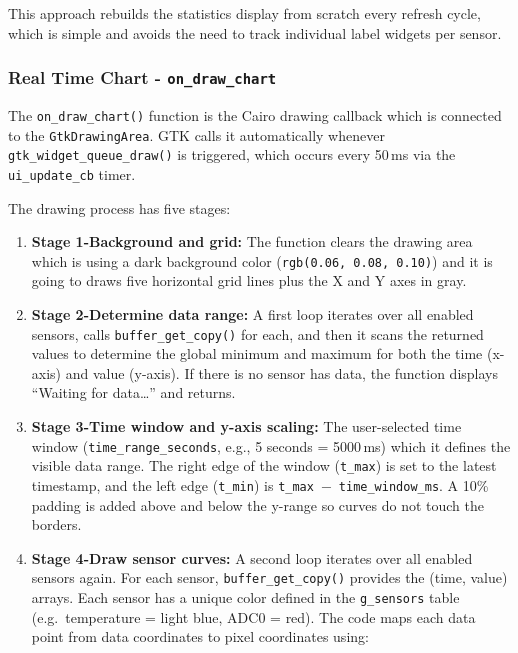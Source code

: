 This approach rebuilds the statistics display from scratch every refresh cycle, which
is simple and avoids the need to track individual label widgets per sensor.

\subsubsection{Real Time Chart - \texttt{on\_draw\_chart}}
The \texttt{on\_draw\_chart()} function is the Cairo drawing callback which is connected
to the \texttt{GtkDrawingArea}. GTK calls it automatically whenever
\texttt{gtk\_widget\_queue\_draw()} is triggered, which occurs every 50\,ms via the
\texttt{ui\_update\_cb} timer.

The drawing process has five stages:

\begin{enumerate}
    \item \textbf{Stage 1-Background and grid:} The function clears the drawing area
    which is using a dark background color (\texttt{rgb(0.06, 0.08, 0.10)}) and it is
    going to draws five horizontal grid lines plus the X and Y axes in gray.

    \item \textbf{Stage 2-Determine data range:} A first loop iterates over all enabled
    sensors, calls \texttt{buffer\_get\_copy()} for each, and then it scans the returned
    values to determine the global minimum and maximum for both the time (x-axis) and
    value (y-axis). If there is no sensor has data, the function displays
    ``Waiting for data\ldots'' and returns.

    \item \textbf{Stage 3-Time window and y-axis scaling:} The user-selected time window
    (\texttt{time\_range\_seconds}, e.g., 5 seconds = 5000\,ms) which it defines the
    visible data range. The right edge of the window (\texttt{t\_max}) is set to the
    latest timestamp, and the left edge (\texttt{t\_min}) is
    \texttt{t\_max}~\(-\)~\texttt{time\_window\_ms}. A 10\% padding is added above and
    below the y-range so curves do not touch the borders.

    \item \textbf{Stage 4-Draw sensor curves:} A second loop iterates over all enabled
    sensors again. For each sensor, \texttt{buffer\_get\_copy()} provides the
    (time, value) arrays. Each sensor has a unique color defined in the
    \texttt{g\_sensors} table (e.g.\ temperature = light blue, ADC0 = red). The code
    maps each data point from data coordinates to pixel coordinates using:
    

\end{enumerate}
